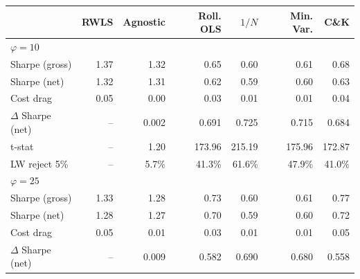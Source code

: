\begin{tabular*}{\textwidth}{l@{\extracolsep{\fill}}rrrrrr}
\toprule
 & RWLS & Agnostic & Roll. OLS & $1/N$ & Min. Var. & C\&K \\
\midrule
\multicolumn{7}{l}{\textit{$\varphi = 10$}} \\
\midrule
Sharpe (gross) & 1.37\phantom{$^{***}$} & 1.32\phantom{$^{***}$} & 0.65\phantom{$^{***}$} & 0.60\phantom{$^{***}$} & 0.61\phantom{$^{***}$} & 0.68\phantom{$^{***}$} \\
Sharpe (net) & 1.32\phantom{$^{***}$} & 1.31\phantom{$^{***}$} & 0.62\phantom{$^{***}$} & 0.59\phantom{$^{***}$} & 0.60\phantom{$^{***}$} & 0.63\phantom{$^{***}$} \\
Cost drag & 0.05\phantom{$^{***}$} & 0.00\phantom{$^{***}$} & 0.03\phantom{$^{***}$} & 0.01\phantom{$^{***}$} & 0.01\phantom{$^{***}$} & 0.04\phantom{$^{***}$} \\
$\Delta$ Sharpe (net) & --\phantom{$^{***}$} & 0.002\phantom{$^{***}$} & 0.691\rlap{$^{***}$}\phantom{$^{***}$} & 0.725\rlap{$^{***}$}\phantom{$^{***}$} & 0.715\rlap{$^{***}$}\phantom{$^{***}$} & 0.684\rlap{$^{***}$}\phantom{$^{***}$} \\
t-stat & --\phantom{$^{***}$} & 1.20\phantom{$^{***}$} & 173.96\phantom{$^{***}$} & 215.19\phantom{$^{***}$} & 175.96\phantom{$^{***}$} & 172.87\phantom{$^{***}$} \\
LW reject 5\% & --\phantom{$^{***}$} & 5.7\%\phantom{$^{***}$} & 41.3\%\phantom{$^{***}$} & 61.6\%\phantom{$^{***}$} & 47.9\%\phantom{$^{***}$} & 41.0\%\phantom{$^{***}$} \\
\midrule
\multicolumn{7}{l}{\textit{$\varphi = 25$}} \\
\midrule
Sharpe (gross) & 1.33\phantom{$^{***}$} & 1.28\phantom{$^{***}$} & 0.73\phantom{$^{***}$} & 0.60\phantom{$^{***}$} & 0.61\phantom{$^{***}$} & 0.77\phantom{$^{***}$} \\
Sharpe (net) & 1.28\phantom{$^{***}$} & 1.27\phantom{$^{***}$} & 0.70\phantom{$^{***}$} & 0.59\phantom{$^{***}$} & 0.60\phantom{$^{***}$} & 0.72\phantom{$^{***}$} \\
Cost drag & 0.05\phantom{$^{***}$} & 0.01\phantom{$^{***}$} & 0.03\phantom{$^{***}$} & 0.01\phantom{$^{***}$} & 0.01\phantom{$^{***}$} & 0.05\phantom{$^{***}$} \\
$\Delta$ Sharpe (net) & --\phantom{$^{***}$} & 0.009\rlap{$^{***}$}\phantom{$^{***}$} & 0.582\rlap{$^{***}$}\phantom{$^{***}$} & 0.690\rlap{$^{***}$}\phantom{$^{***}$} & 0.680\rlap{$^{***}$}\phantom{$^{***}$} & 0.558\rlap{$^{***}$}\phantom{$^{***}$} \\

\end{tabular*}
